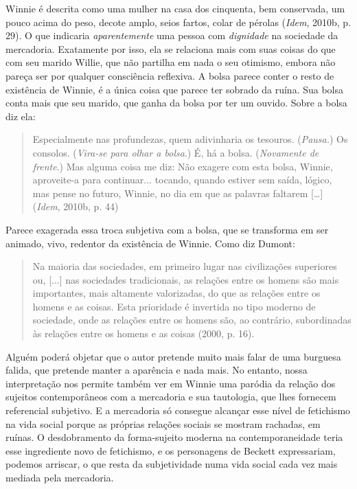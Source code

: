 Winnie é descrita como uma mulher na casa dos cinquenta, bem conservada,
um pouco acima do peso, decote amplo, seios fartos, colar de pérolas
(\emph{Idem}, 2010b, p. 29). O que indicaria \emph{aparentemente} uma
pessoa com \emph{dignidade} na sociedade da mercadoria. Exatamente por
isso, ela se relaciona mais com suas coisas do que com seu marido
Willie, que não partilha em nada o seu otimismo, embora não pareça ser
por qualquer consciência reflexiva. A bolsa parece conter o resto de
existência de Winnie, é a única coisa que parece ter sobrado da ruína.
Sua bolsa conta mais que seu marido, que ganha da bolsa por ter um
ouvido. Sobre a bolsa diz ela:

\begin{quote}
Especialmente nas profundezas, quem adivinharia os tesouros.
(\emph{Pausa.}) Os consolos. (\emph{Vira-se para olhar a bolsa}.) É, há
a bolsa. (\emph{Novamente de frente}.) Mas alguma coisa me diz: Não
exagere com esta bolsa, Winnie, aproveite-a para continuar... tocando,
quando estiver sem saída, lógico, mas pense no futuro, Winnie, no dia em
que as palavras faltarem {[}\ldots{}{]} (\emph{Idem}, 2010b, p. 44)
\end{quote}

Parece exagerada essa troca subjetiva com a bolsa, que se transforma em
ser animado, vivo, redentor da existência de Winnie. Como diz Dumont:

\begin{quote}
Na maioria das sociedades, em primeiro lugar nas civilizações superiores
ou, {[}...{]} nas sociedades tradicionais, as relações entre os homens
são mais importantes, mais altamente valorizadas, do que as relações
entre os homens e as coisas. Esta prioridade é invertida no tipo moderno
de sociedade, onde as relações entre os homens são, ao contrário,
subordinadas às relações entre os homens e as coisas (2000, p. 16).
\end{quote}

Alguém poderá objetar que o autor pretende muito mais falar de uma
burguesa falida, que pretende manter a aparência e nada mais. No
entanto, nossa interpretação nos permite também ver em Winnie uma
paródia da relação dos sujeitos contemporâneos com a mercadoria e sua
tautologia, que lhes fornecem referencial subjetivo. E a mercadoria só
consegue alcançar esse nível de fetichismo na vida social porque as
próprias relações sociais se mostram rachadas, em ruínas. O
desdobramento da forma-sujeito moderna na contemporaneidade teria esse
ingrediente novo de fetichismo, e os personagens de Beckett
expressariam, podemos arriscar, o que resta da subjetividade numa vida
social cada vez mais mediada pela mercadoria.

